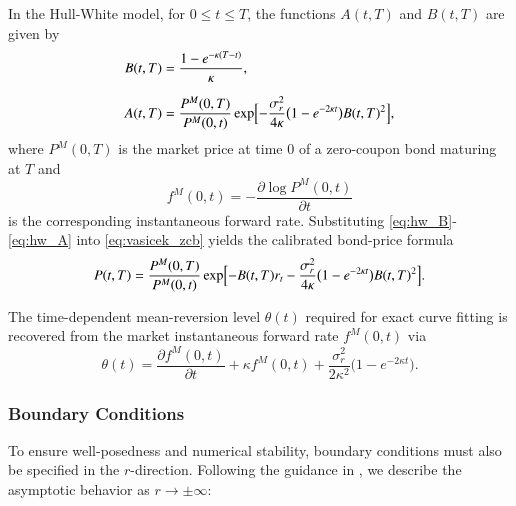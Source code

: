 \documentclass[12pt]{report} %
\theoremstyle{plain} %
\theoremstyle{definition} %
\theoremstyle{remark} %
\begin{document}
In the Hull-White model, for \(0\le t\le T\), the functions \(A(t,T)\) and \(B(t,T)\) are given by \cite{brigo2013interest}
\begin{align}
 B(t,T) &= \frac{1-e^{-\kappa (T-t)}}{\kappa},\label{eq:hw_B}\\[6pt]
 A(t,T) &= \frac{P^{M}(0,T)}{P^{M}(0,t)}
      \exp\Bigl[
       -\frac{\sigma_r^{2}}{4\kappa}\bigl(1-e^{-2\kappa t}\bigr)B(t,T)^{2}
      \Bigr],\label{eq:hw_A}
\end{align}
where \(P^{M}(0,T)\) is the market price at time \(0\) of a zero-coupon bond maturing at \(T\) and
\[f^{M}(0,t) = -\frac{\partial\log P^{M}(0,t)}{\partial t}\]
 is the corresponding instantaneous forward rate.
Substituting \eqref{eq:hw_B}-\eqref{eq:hw_A} into \eqref{eq:vasicek_zcb} yields the calibrated bond-price formula
\begin{equation}\label{eq:hw_zcb_calibrated}
 P(t,T)=\frac{P^{M}(0,T)}{P^{M}(0,t)}
     \exp\Bigl[
      -B(t,T) r_t
      -\frac{\sigma_r^{2}}{4\kappa}\bigl(1-e^{-2\kappa t}\bigr)B(t,T)^{2}
     \Bigr].
\end{equation}

The time-dependent mean-reversion level \(\theta(t)\) required for exact curve
fitting is recovered from the market instantaneous forward rate \(f^{M}(0,t)\) via
\begin{equation}\label{eq:hw_theta}
 \theta(t)
 = \frac{\partial f^{M}(0,t)}{\partial t}
  + \kappa f^{M}(0,t)
  + \frac{\sigma_r^{2}}{2\kappa^{2}}\bigl(1-e^{-2\kappa t}\bigr).
\end{equation}

\subsubsection{Boundary Conditions}

To ensure well-posedness and numerical stability, boundary conditions 
must also be specified in the \( r \)-direction. Following the 
guidance in \cite{duffy2022numerical}, we describe the asymptotic 
behavior as \( r \to \pm\infty \):
\end{document}
